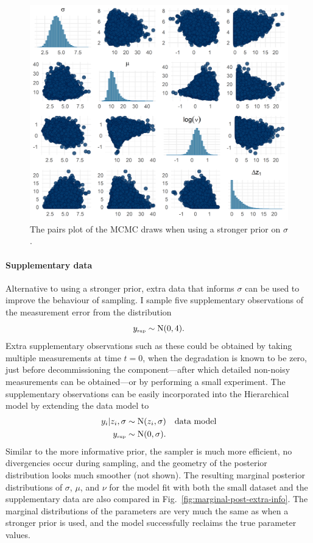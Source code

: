 \begin{figure}
  \centering
  \includegraphics[width=0.8\columnwidth]{./figures/ch-4/strong-prior-pairs.png}
  \caption{The pairs plot of the MCMC draws when using a stronger prior on $\sigma$.}
  \label{fig:pairs-strong-prior}
\end{figure}

\paragraph*{Supplementary data}

Alternative to using a stronger prior, extra data that informs $\sigma$ can be used to improve the behaviour of sampling. I sample five supplementary observations of the measurement error from the distribution
\begin{equation*}
 y_{\text{\tiny{sup}}} \sim \mbox{N}(0, 4).
\end{equation*}
Extra supplementary observations such as these could be obtained by taking multiple measurements at time $t = 0$, when the degradation is known to be zero, just before decommissioning the component---after which detailed non-noisy measurements can be obtained---or by performing a small experiment. The supplementary observations can be easily incorporated into the Hierarchical model by extending the data model to
\begin{align*}
 y_i|z_i, \sigma & \sim \mbox{N}(z_i, \sigma) && \mbox{data model} \\
 y_{\text{\tiny{sup}}} & \sim \mbox{N}(0, \sigma).
\end{align*}
Similar to the more informative prior, the sampler is much more efficient, no divergencies occur during sampling, and the geometry of the posterior distribution looks much smoother (not shown). The resulting marginal posterior distributions of $\sigma$, $\mu$, and $\nu$ for the model fit with both the small dataset and the supplementary data are also compared in Fig.~\ref{fig:marginal-post-extra-info}. The marginal distributions of the parameters are very much the same as when a stronger prior is used, and the model successfully reclaims the true parameter values.

